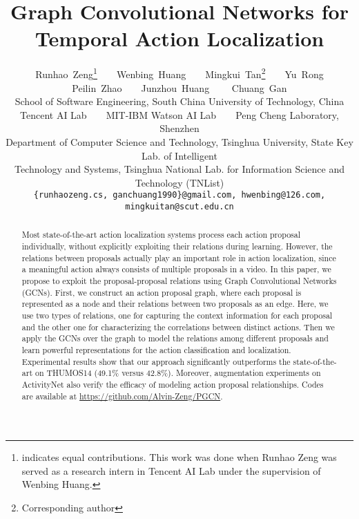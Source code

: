 \documentclass[10pt,twocolumn,letterpaper]{article}
\begin{document}
	
\title{Graph Convolutional Networks for Temporal Action Localization}
	
	\author{
		Runhao~Zeng\thanks{indicates equal contributions. This work was done when Runhao Zeng was served as a research intern in Tencent AI Lab under the supervision of Wenbing Huang.}~~~~Wenbing~Huang~~~~Mingkui~Tan\thanks{Corresponding author}~~~~Yu~Rong\\
		Peilin~Zhao~~~~Junzhou~Huang~~~~ Chuang~Gan\\
		School of Software Engineering, South China University of Technology, China \\ 
		Tencent AI Lab~~~~MIT-IBM Watson AI Lab~~~~Peng Cheng Laboratory, Shenzhen \\
		Department of Computer Science and Technology, Tsinghua University, State Key Lab. of Intelligent \\
		Technology and Systems, Tsinghua National Lab. for Information Science and Technology (TNList) \\
		{\tt\small \{runhaozeng.cs, ganchuang1990\}@gmail.com, hwenbing@126.com,
			mingkuitan@scut.edu.cn}
	}
	
	\maketitle
\ificcvfinal\thispagestyle{empty}\fi
	
	\begin{abstract}
		Most state-of-the-art action localization systems process each action proposal individually, without explicitly exploiting their relations during learning. However, the relations between proposals actually play an important role in action localization, since a meaningful action always consists of multiple proposals in a video. In this paper, we propose to exploit the proposal-proposal relations using Graph Convolutional Networks (GCNs). First, we construct an action proposal graph, where each proposal is represented as a node and their relations between two proposals as an edge. Here, we use two types of relations, one for capturing the context information for each proposal and the other one for characterizing the correlations between distinct actions. Then we apply the GCNs over the graph to model the relations among different proposals and learn powerful representations for the action classification and localization. Experimental results show that our approach significantly outperforms the state-of-the-art on THUMOS14 (49.1\% versus 42.8\%). Moreover, augmentation experiments on ActivityNet also verify the efficacy of modeling action proposal relationships. Codes are available at \href{https://github.com/Alvin-Zeng/PGCN}{https://github.com/Alvin-Zeng/PGCN}.
		
	\end{abstract}
	
\end{document}
